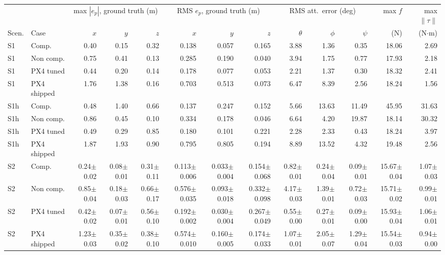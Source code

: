 \begin{tabular}{llrrrrrrrrrrr}
\toprule
 & & \multicolumn{3}{c}{max $|e_p|$, ground truth (m)} & \multicolumn{3}{c}{RMS $e_p$, ground truth (m)} & \multicolumn{3}{c}{RMS att.\ error (deg)} & max $f$ & max $\|\tau\|$ \\
\cmidrule(lr){3-5}\cmidrule(lr){6-8}\cmidrule(lr){9-11}
Scen. & Case & $x$ & $y$ & $z$ & $x$ & $y$ & $z$ & $\theta$ & $\phi$ & $\psi$ & (N) & (N$\cdot$m) \\
\midrule
S1 & Comp. & 0.40 & 0.15 & 0.32 & 0.138 & 0.057 & 0.165 & 3.88 & 1.36 & 0.35 & 18.06 & 2.69 \\
S1 & Non comp. & 0.75 & 0.41 & 0.13 & 0.285 & 0.190 & 0.040 & 3.94 & 1.75 & 0.77 & 17.93 & 2.18 \\
S1 & PX4 tuned & 0.44 & 0.20 & 0.14 & 0.178 & 0.077 & 0.053 & 2.21 & 1.37 & 0.30 & 18.32 & 2.41 \\
S1 & PX4 shipped & 1.76 & 1.38 & 0.16 & 0.703 & 0.513 & 0.073 & 6.47 & 8.39 & 2.56 & 18.24 & 1.56 \\
S1h & Comp. & 0.48 & 1.40 & 0.66 & 0.137 & 0.247 & 0.152 & 5.66 & 13.63 & 11.49 & 45.95 & 31.63 \\
S1h & Non comp. & 0.86 & 0.45 & 0.10 & 0.334 & 0.178 & 0.046 & 6.64 & 4.20 & 19.87 & 18.14 & 30.32 \\
S1h & PX4 tuned & 0.49 & 0.29 & 0.85 & 0.180 & 0.101 & 0.221 & 2.28 & 2.33 & 0.43 & 18.24 & 3.97 \\
S1h & PX4 shipped & 1.87 & 1.93 & 0.90 & 0.795 & 0.805 & 0.194 & 8.89 & 13.52 & 4.32 & 19.48 & 2.56 \\
S2 & Comp. & 0.24$\pm$0.02 & 0.08$\pm$0.01 & 0.31$\pm$0.11 & 0.113$\pm$0.006 & 0.033$\pm$0.004 & 0.154$\pm$0.068 & 0.82$\pm$0.01 & 0.24$\pm$0.04 & 0.09$\pm$0.01 & 15.67$\pm$0.04 & 1.07$\pm$0.03 \\
S2 & Non comp. & 0.85$\pm$0.04 & 0.18$\pm$0.03 & 0.66$\pm$0.17 & 0.576$\pm$0.035 & 0.093$\pm$0.018 & 0.332$\pm$0.098 & 4.17$\pm$0.03 & 1.39$\pm$0.01 & 0.72$\pm$0.03 & 15.71$\pm$0.02 & 0.99$\pm$0.01 \\
S2 & PX4 tuned & 0.42$\pm$0.02 & 0.07$\pm$0.01 & 0.56$\pm$0.10 & 0.192$\pm$0.002 & 0.030$\pm$0.004 & 0.267$\pm$0.049 & 0.55$\pm$0.00 & 0.27$\pm$0.01 & 0.09$\pm$0.00 & 15.93$\pm$0.04 & 1.06$\pm$0.01 \\
S2 & PX4 shipped & 1.23$\pm$0.03 & 0.35$\pm$0.02 & 0.38$\pm$0.10 & 0.574$\pm$0.010 & 0.160$\pm$0.005 & 0.174$\pm$0.033 & 1.07$\pm$0.01 & 2.05$\pm$0.07 & 1.29$\pm$0.04 & 15.54$\pm$0.03 & 0.94$\pm$0.00 \\

\end{tabular}
